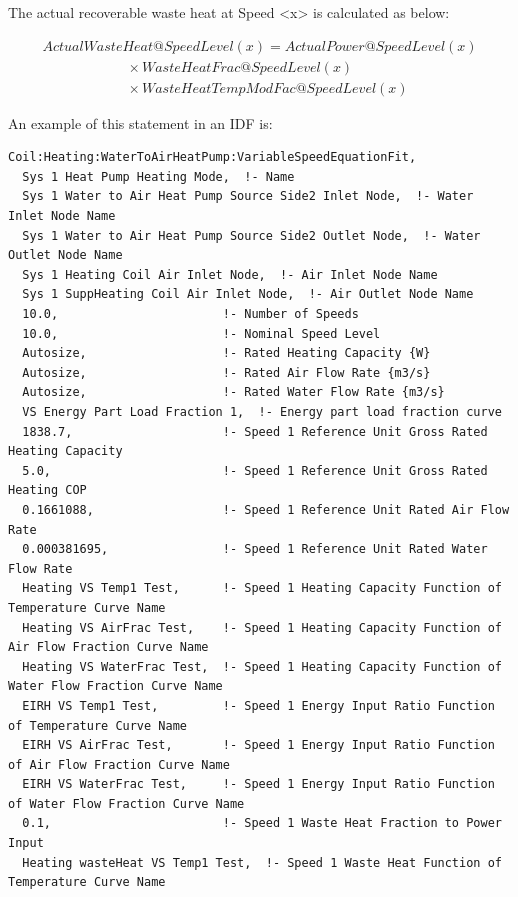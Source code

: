 The actual recoverable waste heat at Speed \textless{}x\textgreater{} is calculated as below:

\begin{equation}
\begin{array}{l}
ActualWasteHeat@SpeedLevel\left( x \right) = ActualPower@SpeedLevel\left( x \right) \\
\quad \quad \quad \quad \quad \quad \times WasteHeatFrac@SpeedLevel(x) \\
\quad \quad \quad \quad \quad \quad \times WasteHeatTempModFac@SpeedLevel(x)
\end{array}
\end{equation}

An example of this statement in an IDF is:

\begin{lstlisting}
Coil:Heating:WaterToAirHeatPump:VariableSpeedEquationFit,
  Sys 1 Heat Pump Heating Mode,  !- Name
  Sys 1 Water to Air Heat Pump Source Side2 Inlet Node,  !- Water Inlet Node Name
  Sys 1 Water to Air Heat Pump Source Side2 Outlet Node,  !- Water Outlet Node Name
  Sys 1 Heating Coil Air Inlet Node,  !- Air Inlet Node Name
  Sys 1 SuppHeating Coil Air Inlet Node,  !- Air Outlet Node Name
  10.0,                       !- Number of Speeds
  10.0,                       !- Nominal Speed Level
  Autosize,                   !- Rated Heating Capacity {W}
  Autosize,                   !- Rated Air Flow Rate {m3/s}
  Autosize,                   !- Rated Water Flow Rate {m3/s}
  VS Energy Part Load Fraction 1,  !- Energy part load fraction curve
  1838.7,                     !- Speed 1 Reference Unit Gross Rated Heating Capacity
  5.0,                        !- Speed 1 Reference Unit Gross Rated Heating COP
  0.1661088,                  !- Speed 1 Reference Unit Rated Air Flow Rate
  0.000381695,                !- Speed 1 Reference Unit Rated Water Flow Rate
  Heating VS Temp1 Test,      !- Speed 1 Heating Capacity Function of Temperature Curve Name
  Heating VS AirFrac Test,    !- Speed 1 Heating Capacity Function of Air Flow Fraction Curve Name
  Heating VS WaterFrac Test,  !- Speed 1 Heating Capacity Function of Water Flow Fraction Curve Name
  EIRH VS Temp1 Test,         !- Speed 1 Energy Input Ratio Function of Temperature Curve Name
  EIRH VS AirFrac Test,       !- Speed 1 Energy Input Ratio Function of Air Flow Fraction Curve Name
  EIRH VS WaterFrac Test,     !- Speed 1 Energy Input Ratio Function of Water Flow Fraction Curve Name
  0.1,                        !- Speed 1 Waste Heat Fraction to Power Input
  Heating wasteHeat VS Temp1 Test,  !- Speed 1 Waste Heat Function of Temperature Curve Name

\end{lstlisting}
